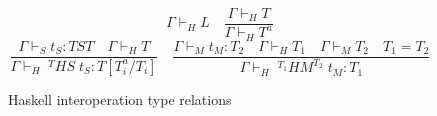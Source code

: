 \begin{figure}
\[
\Gamma\vdash_{H}L
\quad
\frac{\Gamma\vdash_{H}T}{\Gamma\vdash_{H}T^{a}}
\]
\[
\frac{\Gamma\vdash_{S}t_{S}:TST\quad\Gamma\vdash_{H}T}{\Gamma\vdash_{H}\;^{T}HS\;t_{S}:T[T^{a}_{i}/T_{i}]}
\quad
\frac{\Gamma\vdash_{M}t_{M}:T_{2}\quad\Gamma\vdash_{H}T_{1}\quad\Gamma\vdash_{M}T_{2}\quad T_{1}=T_{2}}{\Gamma\vdash_{H}\;^{T_{1}}HM^{T_{2}}\;t_{M}:T_{1}}
\]
\caption{Haskell interoperation type relations}
\label{hitr}
\end{figure}